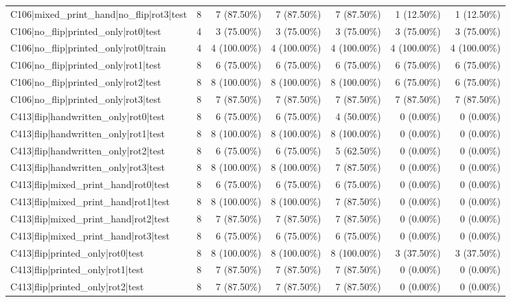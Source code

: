 \begin{longtable}{>{\raggedright\arraybackslash}p{5cm}rrrrrr}
C106|mixed\_print\_hand|no\_flip|rot3|test & 8 & 7 (87.50\%) & 7 (87.50\%) & 7 (87.50\%) & 1 (12.50\%) & 1 (12.50\%) \\
C106|no\_flip|printed\_only|rot0|test & 4 & 3 (75.00\%) & 3 (75.00\%) & 3 (75.00\%) & 3 (75.00\%) & 3 (75.00\%) \\
C106|no\_flip|printed\_only|rot0|train & 4 & 4 (100.00\%) & 4 (100.00\%) & 4 (100.00\%) & 4 (100.00\%) & 4 (100.00\%) \\
C106|no\_flip|printed\_only|rot1|test & 8 & 6 (75.00\%) & 6 (75.00\%) & 6 (75.00\%) & 6 (75.00\%) & 6 (75.00\%) \\
C106|no\_flip|printed\_only|rot2|test & 8 & 8 (100.00\%) & 8 (100.00\%) & 8 (100.00\%) & 6 (75.00\%) & 6 (75.00\%) \\
C106|no\_flip|printed\_only|rot3|test & 8 & 7 (87.50\%) & 7 (87.50\%) & 7 (87.50\%) & 7 (87.50\%) & 7 (87.50\%) \\
C413|flip|handwritten\_only|rot0|test & 8 & 6 (75.00\%) & 6 (75.00\%) & 4 (50.00\%) & 0 (0.00\%) & 0 (0.00\%) \\
C413|flip|handwritten\_only|rot1|test & 8 & 8 (100.00\%) & 8 (100.00\%) & 8 (100.00\%) & 0 (0.00\%) & 0 (0.00\%) \\
C413|flip|handwritten\_only|rot2|test & 8 & 6 (75.00\%) & 6 (75.00\%) & 5 (62.50\%) & 0 (0.00\%) & 0 (0.00\%) \\
C413|flip|handwritten\_only|rot3|test & 8 & 8 (100.00\%) & 8 (100.00\%) & 7 (87.50\%) & 0 (0.00\%) & 0 (0.00\%) \\
C413|flip|mixed\_print\_hand|rot0|test & 8 & 6 (75.00\%) & 6 (75.00\%) & 6 (75.00\%) & 0 (0.00\%) & 0 (0.00\%) \\
C413|flip|mixed\_print\_hand|rot1|test & 8 & 8 (100.00\%) & 8 (100.00\%) & 7 (87.50\%) & 0 (0.00\%) & 0 (0.00\%) \\
C413|flip|mixed\_print\_hand|rot2|test & 8 & 7 (87.50\%) & 7 (87.50\%) & 7 (87.50\%) & 0 (0.00\%) & 0 (0.00\%) \\
C413|flip|mixed\_print\_hand|rot3|test & 8 & 6 (75.00\%) & 6 (75.00\%) & 6 (75.00\%) & 0 (0.00\%) & 0 (0.00\%) \\
C413|flip|printed\_only|rot0|test & 8 & 8 (100.00\%) & 8 (100.00\%) & 8 (100.00\%) & 3 (37.50\%) & 3 (37.50\%) \\
C413|flip|printed\_only|rot1|test & 8 & 7 (87.50\%) & 7 (87.50\%) & 7 (87.50\%) & 0 (0.00\%) & 0 (0.00\%) \\
C413|flip|printed\_only|rot2|test & 8 & 7 (87.50\%) & 7 (87.50\%) & 7 (87.50\%) & 0 (0.00\%) & 0 (0.00\%) \\

\end{longtable}

